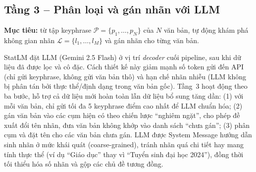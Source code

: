 \subsection{Tầng 3 -- Phân loại và gán nhãn với LLM}
\textbf{Mục tiêu:} từ tập keyphrase $\mathcal{P}=\{p_1,\dots,p_N\}$ của $N$ văn
bản, tự động khám phá không gian nhãn $\mathcal{L}=\{l_1,\dots,l_M\}$ và gán nhãn
cho từng văn bản.

StatLM đặt LLM (Gemini 2.5 Flash) ở vị trí \emph{decoder} cuối pipeline, sau khi
dữ liệu đã được lọc và cô đặc. Cách thiết kế này giảm mạnh số token gửi đến API
(chỉ gửi keyphrase, không gửi văn bản thô) và hạn chế nhãn nhiễu (LLM không bị
phân tán bởi thực thể/định dạng trong văn bản gốc). Tầng~3 hoạt động theo ba bước, hỗ
trợ cả dữ liệu mới hoàn toàn lẫn dữ liệu bổ sung tăng dần: (1) với mỗi văn bản,
chỉ gửi tối đa 5 keyphrase điểm cao nhất để LLM chuẩn hóa; (2) gán văn bản vào các
cụm hiện có theo chiến lược ``nghiêm ngặt'', cho phép đề xuất đổi tên nhãn, đưa
văn bản không khớp vào danh sách ``chưa gán''; (3) phân cụm và đặt tên cho các văn
bản chưa gán. LLM được System Message hướng dẫn sinh nhãn ở mức khái quát
(coarse-grained), tránh nhãn quá chi tiết hay mang tính thực thể (ví dụ ``Giáo
dục'' thay vì ``Tuyển sinh đại học 2024''), đồng thời tối thiểu hóa số nhãn và
gộp các chủ đề tương đồng.

